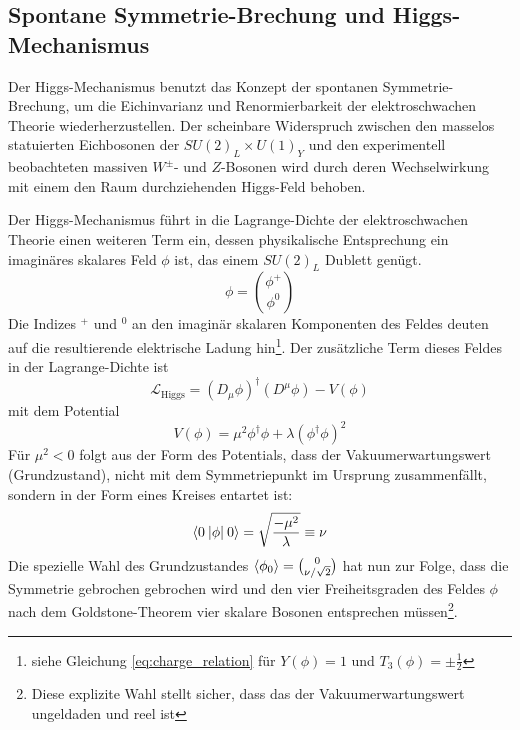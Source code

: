 \development



\subsection{Spontane Symmetrie-Brechung und Higgs-Mechanismus}
Der Higgs-Mechanismus benutzt das Konzept der spontanen Symmetrie-Brechung, um
die Eichinvarianz und Renormierbarkeit der elektroschwachen Theorie
wiederherzustellen. Der scheinbare Widerspruch zwischen den masselos
statuierten Eichbosonen der $SU(2)_L \times U(1)_Y$ und den experimentell
beobachteten massiven $W^\pm$- und $Z$-Bosonen wird durch deren Wechselwirkung
mit einem den Raum durchziehenden Higgs-Feld behoben.

Der Higgs-Mechanismus führt in die Lagrange-Dichte der elektroschwachen Theorie
einen weiteren Term ein, dessen physikalische Entsprechung ein imaginäres
skalares Feld $\phi$ ist, das einem $SU(2)_L$ Dublett genügt.
\begin{equation}
    \phi = \binom{\phi^+}{\phi^0}
\end{equation}
Die Indizes $^+$ und $^0$ an den imaginär skalaren Komponenten des Feldes
deuten auf die resultierende elektrische Ladung hin\footnote{siehe Gleichung
\ref{eq:charge_relation} für $Y(\phi)=1$ und $T_3(\phi)=\pm\tfrac{1}{2}$}.
Der zusätzliche Term dieses Feldes in der Lagrange-Dichte ist
\begin{equation}
    \mathcal{L}_\text{Higgs} = (D_\mu\phi)^\dagger(D^\mu\phi) - V(\phi)
\end{equation}
mit dem Potential
\begin{equation}
    V(\phi) = \mu^2\phi^\dagger\phi + \lambda (\phi^\dagger\phi )^2
\end{equation}
Für $\mu^2<0$ folgt aus der Form des Potentials, dass der Vakuumerwartungswert
(Grundzustand), nicht mit dem Symmetriepunkt im Ursprung zusammenfällt, sondern
in der Form eines Kreises entartet ist:
\begin{equation}
    \braket{0\:|\phi|\:0} = \sqrt{\frac{-\mu^2}{\lambda}} \equiv \nu 
\end{equation}
Die spezielle Wahl des Grundzustandes $\braket{\phi_0}=\binom{0}{\nu/\sqrt{2}}$
hat nun zur Folge, dass die Symmetrie gebrochen gebrochen wird und den vier
Freiheitsgraden des Feldes $\phi$ nach dem Goldstone-Theorem vier skalare
Bosonen entsprechen müssen\footnote{Diese explizite Wahl stellt sicher, dass
das der Vakuumerwartungswert ungeldaden und reel ist}.

